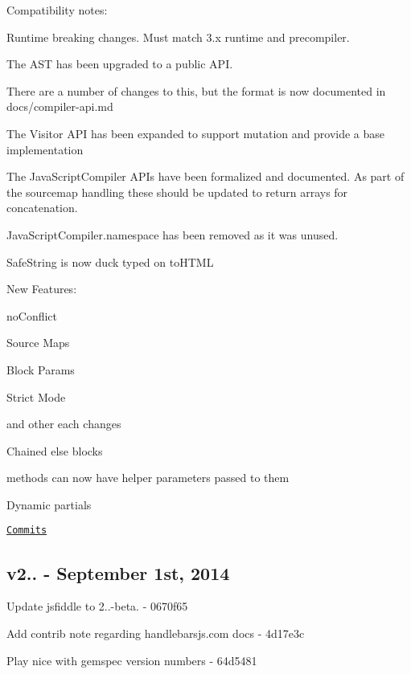 Compatibility notes\+:
\begin{DoxyItemize}
\item Runtime breaking changes. Must match 3.\+x runtime and precompiler.
\item The A\+S\+T has been upgraded to a public A\+P\+I.
\begin{DoxyItemize}
\item There are a number of changes to this, but the format is now documented in docs/compiler-\/api.\+md
\item The Visitor A\+P\+I has been expanded to support mutation and provide a base implementation
\end{DoxyItemize}
\item The {\ttfamily Java\+Script\+Compiler} A\+P\+Is have been formalized and documented. As part of the sourcemap handling these should be updated to return arrays for concatenation.
\item {\ttfamily Java\+Script\+Compiler.\+namespace} has been removed as it was unused.
\item {\ttfamily Safe\+String} is now duck typed on {\ttfamily to\+H\+T\+M\+L}
\end{DoxyItemize}

New Features\+:
\begin{DoxyItemize}
\item no\+Conflict
\item Source Maps
\item Block Params
\item Strict Mode
\item and other each changes
\item Chained else blocks
\item methods can now have helper parameters passed to them
\item Dynamic partials
\end{DoxyItemize}

\href{https://github.com/wycats/handlebars.js/compare/v2.0.0...v3.0.0}{\tt Commits}

\subsection*{v2.. -\/ September 1st, 2014}


\begin{DoxyItemize}
\item Update jsfiddle to 2..-\/beta. -\/ 0670f65
\item Add contrib note regarding handlebarsjs.\+com docs -\/ 4d17e3c
\item Play nice with gemspec version numbers -\/ 64d5481
\end{DoxyItemize}

